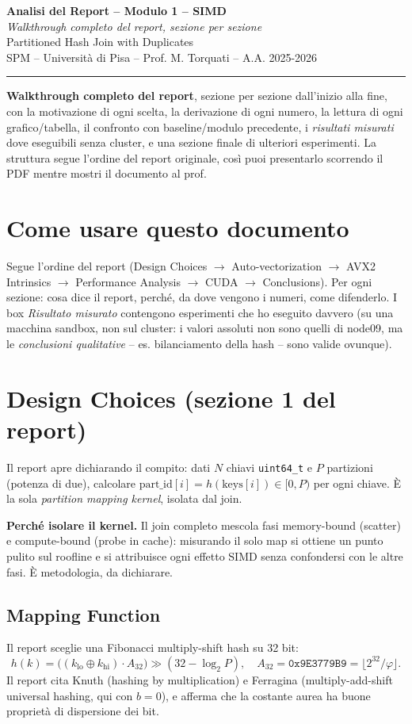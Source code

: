 \documentclass[11pt,a4paper]{article}
\newcommand{\doctitle}[2]{%
  \begin{titlepage}\centering\vspace*{2cm}
  {\LARGE\bfseries Analisi del Report -- #1\\[0.6em]}
  {\large\itshape #2}\\[1.5em]
  {\large Partitioned Hash Join with Duplicates}\\[0.4em]
  {\large SPM -- Università di Pisa -- Prof. M. Torquati -- A.A. 2025-2026}\\[2em]
  \hrule\vspace{1em}
  \begin{flushleft}\small \textbf{Walkthrough completo del report}, sezione per sezione dall'inizio alla fine, con la motivazione di ogni scelta, la derivazione di ogni numero, la lettura di ogni grafico/tabella, il confronto con baseline/modulo precedente, i \emph{risultati misurati} dove eseguibili senza cluster, e una sezione finale di ulteriori esperimenti. La struttura segue l'ordine del report originale, così puoi presentarlo scorrendo il PDF mentre mostri il documento al prof.\end{flushleft}
  \end{titlepage}
  \tableofcontents\newpage}
\begin{document}
\doctitle{Modulo 1 -- SIMD}{Walkthrough completo del report, sezione per sezione}

\section*{Come usare questo documento}
Segue l'ordine del report (Design Choices $\to$ Auto-vectorization $\to$ AVX2 Intrinsics $\to$ Performance Analysis $\to$ CUDA $\to$ Conclusions). Per ogni sezione: cosa dice il report, perché, da dove vengono i numeri, come difenderlo. I box \emph{Risultato misurato} contengono esperimenti che ho eseguito davvero (su una macchina sandbox, non sul cluster: i valori assoluti non sono quelli di node09, ma le \emph{conclusioni qualitative} -- es. bilanciamento della hash -- sono valide ovunque).

\section{Design Choices (sezione 1 del report)}

Il report apre dichiarando il compito: dati $N$ chiavi \texttt{uint64\_t} e $P$ partizioni (potenza di due), calcolare $\text{part\_id}[i]=h(\text{keys}[i])\in[0,P)$ per ogni chiave. È la sola \emph{partition mapping kernel}, isolata dal join.

\begin{motiv}
\textbf{Perché isolare il kernel.} Il join completo mescola fasi memory-bound (scatter) e compute-bound (probe in cache): misurando il solo map si ottiene un punto pulito sul roofline e si attribuisce ogni effetto SIMD senza confondersi con le altre fasi. È metodologia, da dichiarare.
\end{motiv}

\subsection{Mapping Function}

Il report sceglie una Fibonacci multiply-shift hash su 32 bit:
\[ h(k)=\bigl((k_\text{lo}\oplus k_\text{hi})\cdot A_{32}\bigr)\gg(32-\log_2 P),\quad A_{32}=\texttt{0x9E3779B9}=\lfloor 2^{32}/\varphi\rfloor. \]
Il report cita Knuth (hashing by multiplication) e Ferragina (multiply-add-shift universal hashing, qui con $b=0$), e afferma che la costante aurea ha buone proprietà di dispersione dei bit.
\end{document}

